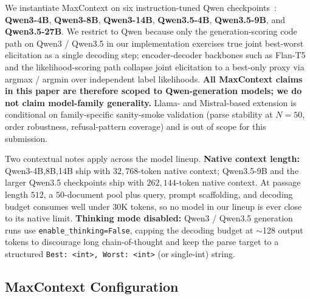 We instantiate MaxContext on six instruction-tuned Qwen
checkpoints~\citep{qwen3technical}: \textbf{Qwen3-4B}, \textbf{Qwen3-8B},
\textbf{Qwen3-14B}, \textbf{Qwen3.5-4B}, \textbf{Qwen3.5-9B}, and
\textbf{Qwen3.5-27B}. We restrict to Qwen because only the
generation-scoring code path on Qwen3 / Qwen3.5 in our implementation
exercises true joint best-worst elicitation as a single decoding step;
encoder-decoder backbones such as Flan-T5~\citep{chung2024flant5} and the
likelihood-scoring path collapse joint elicitation to a best-only proxy via
argmax / argmin over independent label likelihoods. \textbf{All MaxContext
claims in this paper are therefore scoped to Qwen-generation models; we do
not claim model-family generality.} Llama- and Mistral-based extension is
conditional on family-specific sanity-smoke validation (parse stability at
$N{=}50$, order robustness, refusal-pattern coverage) and is out of scope
for this submission.

Two contextual notes apply across the model lineup. \textbf{Native context
length:} Qwen3-{4B,8B,14B} ship with $32{,}768$-token native context;
Qwen3.5-9B and the larger Qwen3.5 checkpoints ship with $262{,}144$-token
native context. At passage length $512$, a $50$-document pool plus query,
prompt scaffolding, and decoding budget consumes well under $30$K tokens,
so no model in our lineup is ever close to its native limit. \textbf{Thinking
mode disabled:} Qwen3 / Qwen3.5 generation runs use
\texttt{enable\_thinking=False}, capping the decoding budget at $\sim$128
output tokens to discourage long chain-of-thought and keep the parse target
to a structured \texttt{Best: <int>, Worst: <int>} (or single-int) string.

\subsection{MaxContext Configuration}
\label{ssec:max_config}

